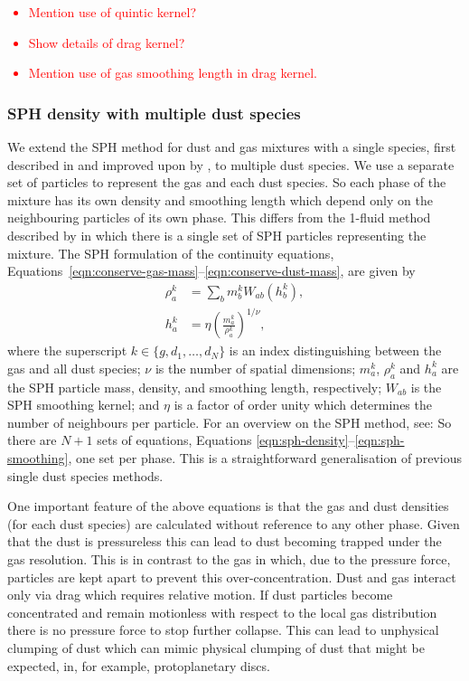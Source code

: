 \documentclass[fleqn,usenatbib]{mnras}
\begin{document}
\textcolor{red}{
\begin{itemize}
   \item Mention use of quintic kernel?
   \item Show details of drag kernel?
   \item Mention use of gas smoothing length in drag kernel.
\end{itemize}
}

\subsubsection{SPH density with multiple dust species}

We extend the SPH method for dust and gas mixtures with a single species, first
described in \citet{Monaghan1995CoPhC..87..225M} and improved upon by
\citet{Laibe2012MNRAS.420.2345L,Laibe2012MNRAS.420.2365L}, to multiple dust
species. We use a separate set of particles to represent the gas and each dust
species. So each phase of the mixture has its own density and smoothing length
which depend only on the neighbouring particles of its own phase. This differs
from the 1-fluid method described by \citet{Hutchison2018MNRAS.476.2186H} in
which there is a single set of SPH particles representing the mixture. The SPH
formulation of the continuity equations,
Equations~\ref{eqn:conserve-gas-mass}--\ref{eqn:conserve-dust-mass}, are given
by
%
\begin{align}
   \label{eqn:sph-density}
   \rho^k_a &= \sum_b m^k_b W_{ab}(h^k_b), \\
   h^k_a &= \eta \left(\frac{m^k_a}{\rho^k_a}\right)^{1/\nu},
   \label{eqn:sph-smoothing}
\end{align}
%
where the superscript \(k \in \{g, d_1, \dots, d_N\}\) is an index
distinguishing between the gas and all dust species; \(\nu\) is the number of
spatial dimensions; \(m^k_a\), \(\rho^k_a\) and \(h^k_a\) are the SPH particle
mass, density, and smoothing length, respectively; \(W_{ab}\) is the SPH
smoothing kernel; and \(\eta\) is a factor of order unity which determines the
number of neighbours per particle. For an overview on the SPH method, see:
\citet{Monaghan1992ARA&A..30..543M,Price2012JCoPh.231..759P}  So there are \(N +
1\) sets of equations, Equations \ref{eqn:sph-density}--\ref{eqn:sph-smoothing},
one set per phase. This is a straightforward generalisation of previous single
dust species methods.

One important feature of the above equations is that the gas and dust densities
(for each dust species) are calculated without reference to any other phase.
Given that the dust is pressureless this can lead to dust becoming trapped under
the gas resolution. This is in contrast to the gas in which, due to the pressure
force, particles are kept apart to prevent this over-concentration. Dust and gas
interact only via drag which requires relative motion. If dust particles become
concentrated and remain motionless with respect to the local gas distribution
there is no pressure force to stop further collapse. This can lead to unphysical
clumping of dust which can mimic physical clumping of dust that might be
expected, in, for example, protoplanetary discs.
\end{document}
